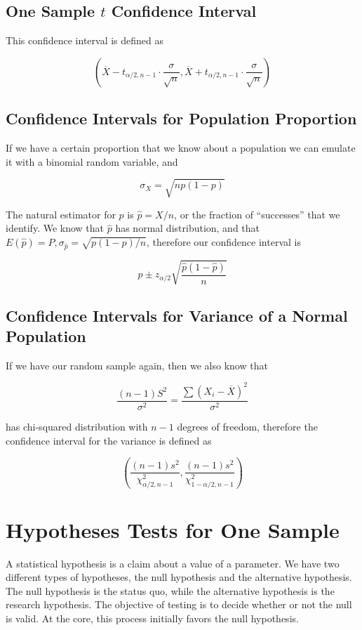    \subsection{One Sample $t$ Confidence Interval}
    This confidence interval is defined as

    \[
        \left(
        \overline{X} - t_{\alpha/2, n - 1} \cdot \frac{\sigma}{\sqrt{n} },
        \overline{X} + t_{\alpha/2, n - 1} \cdot \frac{\sigma}{\sqrt{n} }
        \right)
    \]

    \subsection{Confidence Intervals for Population Proportion}
    If we have a certain proportion that we know about a population we can emulate it with a binomial random variable,
    and

    \[
        \sigma_X = \sqrt{np ( 1 - p)}
    \]

    The natural estimator for $p$ is $\hat{p} = X / n$, or the fraction of ``successes'' that we identify. We know that
    $\hat{p}$ has normal distribution, and that $E(\hat{p}) = P, \sigma_{\hat{p} } = \sqrt{p (1 - p) / n}$, therefore our
    confidence interval is

    \[
        \hat{p} \pm z_{\alpha/2} \sqrt{\frac{\hat{p}(1 - \hat{p})}{n} }
    \]

    \subsection{Confidence Intervals for Variance of a Normal Population}
    If we have our random sample again, then we also know that

    \[
        \frac{(n - 1) S^2}{\sigma^2} = \frac{\sum {\left( X_i - \overline{X} \right)}^2}{\sigma^2}
    \]

    has chi-squared distribution with $n - 1$ degrees of freedom, therefore the confidence interval for the variance is
    defined as

    \[
        \left(
        \frac{(n - 1)s^2}{\chi^2_{\alpha/2, n - 1} },
        \frac{(n - 1)s^2}{\chi^2_{1 - \alpha/2, n - 1} }
        \right)
    \]

\section{Hypotheses Tests for One Sample}
A statistical hypothesis is a claim about a value of a parameter. We have two different types of hypotheses, the null
hypothesis and the alternative hypothesis. The null hypothesis is the status quo, while the alternative hypothesis is
the research hypothesis. The objective of testing is to decide whether or not the null is valid. At the core, this
process initially favors the null hypothesis.

